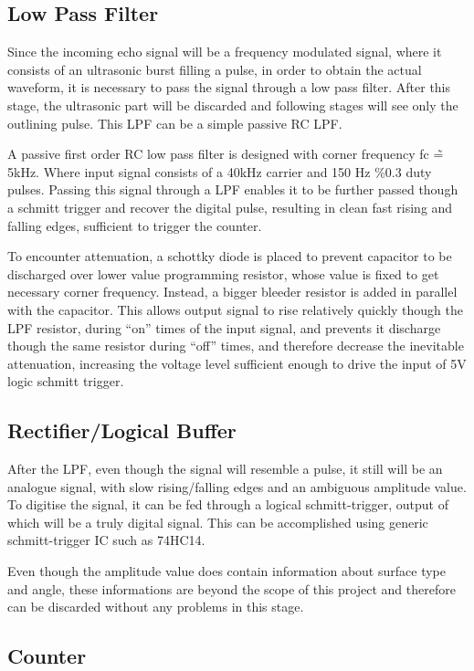 \documentclass[12pt, a4paper]{article}
\begin{document}
	
	\subsection{Low Pass Filter}
	Since the incoming echo signal will be a frequency modulated signal, where it consists of an ultrasonic burst filling a pulse, in order to obtain the actual waveform, it is necessary to pass the signal through a low pass filter. 
	After this stage, the ultrasonic part will be discarded and following stages will see only the outlining pulse. This LPF can be a simple passive RC LPF.
	
	\bigskip
	A passive first order RC low pass filter is designed with corner frequency fc \~= 5kHz. Where input signal consists of a 40kHz carrier and 150 Hz \%0.3 duty pulses. Passing this signal through a LPF enables it to be further passed though a schmitt trigger and recover the digital pulse, resulting in clean fast rising and falling edges, sufficient to trigger the counter.

To encounter attenuation, a schottky diode is placed to prevent capacitor to be discharged over lower value programming resistor, whose value is fixed to get necessary corner frequency. Instead, a bigger bleeder resistor is added in parallel with the capacitor. This allows output signal to rise relatively quickly though the LPF resistor, during “on” times of the input signal, and prevents it discharge though the same resistor during “off” times, and therefore decrease the inevitable attenuation, increasing the voltage level sufficient enough to drive the input of 5V logic schmitt trigger.
	
	\subsection{Rectifier/Logical Buffer}
	After the LPF, even though the signal will resemble a pulse, it still will be an analogue signal, with slow rising/falling edges and an ambiguous amplitude value. To digitise the signal, it can be fed through a logical schmitt-trigger, output of which will be a truly digital signal. This can be accomplished using generic schmitt-trigger IC such as 74HC14.

	Even though the amplitude value does contain information about surface type and angle, these informations are beyond the scope of this project and therefore can be discarded without any problems in this stage.
	
	\subsection{Counter}
	
\end{document}
